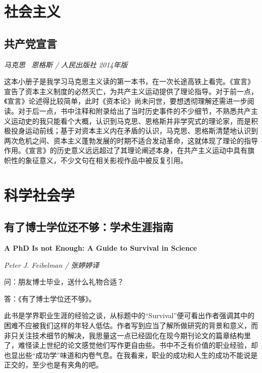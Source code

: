 
\section{社会主义}

\subsection*{共产党宣言}
\par \emph{马克思 \ 恩格斯 / 人民出版社 2014年版}
\par 这本小册子是我学习马克思主义读的第一本书，在一次长途高铁上看完。《宣言》宣告了资本主义制度的必然灭亡，为共产主义运动提供了理论指导。对于前一点，《宣言》论述得比较简单，此时《资本论》尚未问世，要想透彻理解还需进一步阅读。对于后一点，书中注释和附录给出了当时历史事件的不少细节，不熟悉共产主义运动史的我只能看个大概，认识到马克思、恩格斯并非学究式的理论家，而是积极投身运动前线；基于对资本主义内在矛盾的认识，马克思、恩格斯清楚地认识到两次危机之间、资本主义蓬勃发展的时期不适合发动革命，这就体现了理论的指导作用。《宣言》的历史意义远远超过了其理论阐述本身，在共产主义运动中具有旗帜性的象征意义，不少文句在相关影视作品中被反复引用。
\par {}

\section{科学社会学}

\subsection*{有了博士学位还不够：学术生涯指南}
\par \textbf{A PhD Is not Enough: A Guide to Survival in Science}
\par \emph{Peter J. Feibelman / 张婷婷译} 
\par 问：朋友博士毕业，送什么礼物合适？
\par 答：《有了博士学位还不够》。
\par 此书是学界职业生涯的经验之谈，从标题中的“Survival”便可看出作者强调其中的困难不应被我们这样的年轻人低估。作者写到应当了解所做研究的背景和意义，而非只关注技术细节的解决，我思量这一点已经固化在现今期刊论文的篇章结构里了，难怪读上世纪的论文感觉他们写作更自由些。书中不乏有价值的职业经验，却也显出些“成功学”味道和内卷气息。在我看来，职业的成功和人生的成功不能说是正交的，至少也是有夹角的吧。
\par {}
